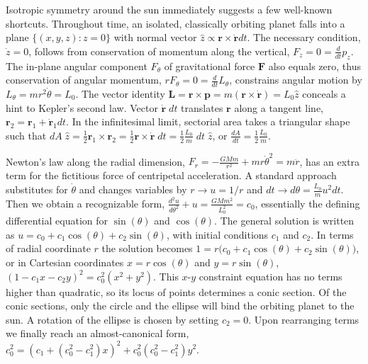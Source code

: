 \documentclass[nofootinbib,preprint]{revtex4-1}
\begin{document}
Isotropic symmetry around the sun immediately suggests a few well-known shortcuts. 
Throughout time, an isolated, classically orbiting planet falls into a plane 
${\{(x,y,z): z=0\}}$ with normal vector $\hat{z} \propto \mathbf{r} \times \mathbf{\dot{r}}dt$.
The necessary condition, $\dot{z}=0$, follows from conservation of momentum along the vertical, 
$F_z = 0 = \frac{d}{dt}p_z$. The in-plane angular component $F_{\theta}$ of gravitational 
force $\mathbf{F}$ also equals zero, thus conservation of angular momentum, 
${r F_{\theta} = 0 = \frac{d}{dt}L_{\theta} }$, constrains angular motion by 
$L_{\theta} = m r^2 \dot{\theta} = L_0$. The vector identity
$\mathbf{L} = \mathbf{r} \times \mathbf{p} = m (\mathbf{r} \times \dot{\mathbf{r}}) = L_0 \hat{z}$ 
conceals a hint to Kepler's second law. Vector $\mathbf{\dot{r}}\;dt$ translates $\mathbf{r}$ along 
a tangent line, $\mathbf{r}_2 = \mathbf{r}_1 + \mathbf{\dot{r}}_1 dt$. In the infinitesimal limit, 
sectorial area takes a triangular shape such that ${dA \; \hat{z} = \frac{1}{2}\mathbf{r}_1 \times\mathbf{r}_2 
=\frac{1}{2}\mathbf{r}\times\mathbf{\dot{r}} \; dt } = \frac{1}{2}\frac{L_0}{m} \; dt \; \hat{z}$,
or $\frac{dA}{dt}=\frac{1}{2}\frac{L_0}{m}$.

Newton's law along the radial dimension, 
$F_r = -\frac{GMm}{r^2} + m r\dot{\theta}^2 = m \ddot{r} $, 
has an extra term for the fictitious force of centripetal acceleration.
A standard approach substitutes for $\dot{\theta}$ and changes 
variables by $r \rightarrow u = 1/r$ and $dt \rightarrow d\theta =  \frac{L_0}{m}u^2 dt$.
Then we obtain a recognizable form, 
$\frac{d^2u}{d\theta^2}+u=\frac{GMm^2}{L_0^2}=c_0$,
essentially the defining differential equation for $\sin(\theta)$ 
and $\cos(\theta)$. The general solution is written as 
$u = c_0 + c_1 \cos(\theta) + c_2 \sin(\theta) $, with initial conditions
$c_1$ and $c_2$. In terms of radial coordinate $r$ the solution becomes 
$1 = r\big(c_0+c_1\cos(\theta)+c_2\sin(\theta)\big)$, or in Cartesian 
coordinates $x=r \cos(\theta)$ and $y=r \sin(\theta)$, 
$(1-c_1 x-c_2 y)^2=c_0^2 (x^2+y^2)$. This $x$-$y$ constraint equation 
has no terms higher than quadratic, so its locus of points determines 
a conic section. Of the conic sections, only the circle and the ellipse 
will bind the orbiting planet to the sun. A rotation of the ellipse 
is chosen by setting $c_2=0$. Upon rearranging terms we finally reach an 
almost-canonical form, $c_0^2 = (c_1+(c_0^2-c_1^2)x)^2  + c_0^2(c_0^2-c_1^2) y^2 $.   
\end{document}
